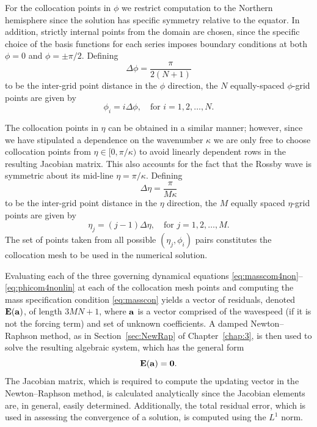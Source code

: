 For the collocation points in $\phi$ we restrict computation to the Northern hemisphere since the solution has specific symmetry relative to the equator. In addition, strictly internal points from the domain are chosen, since the specific choice of the basis functions for each series imposes boundary conditions at both $\phi=0$ and $\phi=\pm \pi/2$. Defining
\begin{equation}
\Delta \phi = \frac{\pi}{2(N+1)} \label{eq:delphicom}
\end{equation}
to be the inter-grid point distance in the $\phi$ direction, the $N$ equally-spaced $\phi$-grid points are given by
\begin{equation}
\phi_i = i \Delta \phi, \quad \text{for } i=1,2,\ldots,N. \label{phigridcom}
\end{equation}

The collocation points in $\eta$ can be obtained in a similar manner; however, since we have stipulated a dependence on the wavenumber $\kappa$ we are only free to choose collocation points from $\eta \in [0,\pi/\kappa)$ to avoid linearly dependent rows in the resulting Jacobian matrix. This also accounts for the fact that the Rossby wave is symmetric about its mid-line $\eta=\pi/\kappa$. Defining 
\begin{equation}
\Delta \eta = \frac{\pi}{M\kappa} \label{eq:deletacom}
\end{equation}
to be the inter-grid point distance in the $\eta$ direction, the $M$ equally spaced $\eta$-grid points are given by
\begin{equation}
\eta_j = (j-1) \Delta \eta, \quad \text{for } j=1,2,\ldots,M. \label{etagridcom}
\end{equation}
The set of points taken from all possible $(\eta_j,\phi_i)$ pairs constitutes the collocation mesh to be used in the numerical solution.

Evaluating each of the three governing dynamical equations \eqref{eq:masscom4non}--\eqref{eq:phicom4nonlin} at each of the collocation mesh points and computing the mass specification condition \eqref{eq:masscon} yields a vector of residuals, denoted $\mathbf{E}(\mathbf{a})$, of length $3MN+1$, where $\mathbf{a}$ is a vector comprised of the wavespeed (if it is not the forcing term) and set of unknown coefficients. A damped Newton--Raphson method, as in Section~\ref{sec:NewRap} of Chapter~\ref{chap:3}, is then used to solve the resulting algebraic system, which has the general form
\begin{equation}
\mathbf{E}(\mathbf{a}) = \mathbf{0}.
\end{equation}
The Jacobian matrix, which is required to compute the updating vector in the Newton--Raphson method, is calculated analytically since the Jacobian elements are, in general, easily determined. Additionally, the total residual error, which is used in assessing the convergence of a solution, is computed using the $L^1$ norm.

